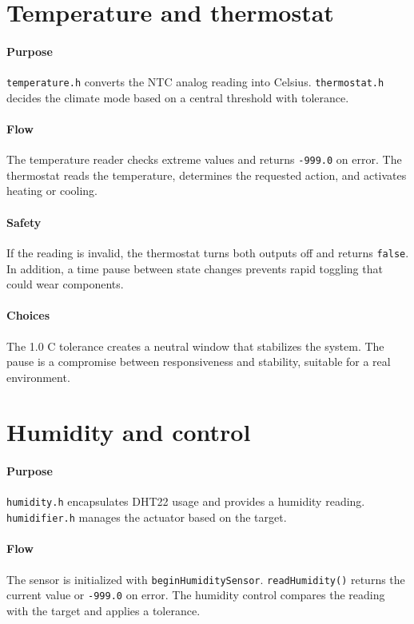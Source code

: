 \section{Temperature and thermostat}
\paragraph{Purpose} \texttt{temperature.h} converts the NTC analog reading into Celsius. \texttt{thermostat.h} decides the climate mode based on a central threshold with tolerance.

\paragraph{Flow} The temperature reader checks extreme values and returns \texttt{-999.0} on error. The thermostat reads the temperature, determines the requested action, and activates heating or cooling.

\paragraph{Safety} If the reading is invalid, the thermostat turns both outputs off and returns \texttt{false}. In addition, a time pause between state changes prevents rapid toggling that could wear components.

\paragraph{Choices} The 1.0 C tolerance creates a neutral window that stabilizes the system. The pause is a compromise between responsiveness and stability, suitable for a real environment.

\section{Humidity and control}
\paragraph{Purpose} \texttt{humidity.h} encapsulates DHT22 usage and provides a humidity reading.\linebreak
\texttt{humidifier.h} manages the actuator based on the target.

\paragraph{Flow} The sensor is initialized with \texttt{beginHumiditySensor}. \texttt{readHumidity()} returns the current value or \texttt{-999.0} on error. The humidity control compares the reading with the target and applies a tolerance.

